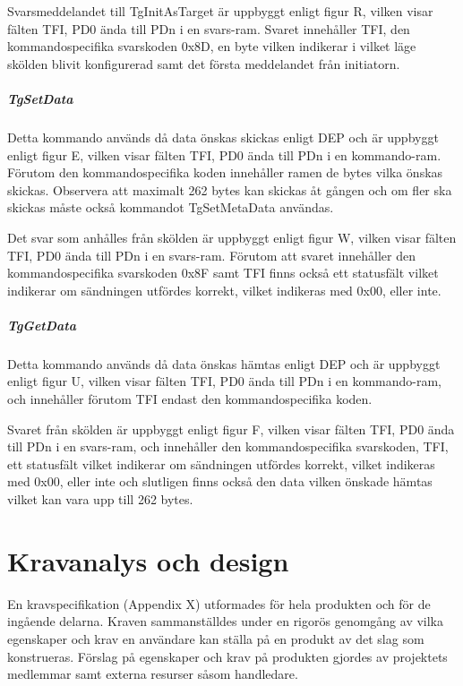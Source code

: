 \documentclass[11pt]{article}
\begin{document}
Svarsmeddelandet till TgInitAsTarget är uppbyggt enligt figur R, vilken visar fälten TFI, PD0 ända till PDn i en svars-ram. Svaret innehåller TFI, den kommandospecifika svarskoden 0x8D, en byte vilken indikerar i vilket läge skölden blivit konfigurerad samt det första meddelandet från initiatorn.


\subparagraph{TgSetData}
Detta kommando används då data önskas skickas enligt DEP och är uppbyggt enligt figur E, vilken visar fälten TFI, PD0 ända till PDn i en kommando-ram. Förutom den kommandospecifika koden innehåller ramen de bytes vilka önskas skickas. Observera att maximalt 262 bytes kan skickas åt gången och om fler ska skickas måste också kommandot TgSetMetaData användas.


Det svar som anhålles från skölden är uppbyggt enligt figur W, vilken visar fälten TFI, PD0 ända till PDn i en svars-ram. Förutom att svaret innehåller den kommandospecifika svarskoden 0x8F samt TFI finns också ett statusfält vilket indikerar om sändningen utfördes korrekt, vilket indikeras med 0x00, eller inte.


\subparagraph{TgGetData}
Detta kommando används då data önskas hämtas enligt DEP och är uppbyggt enligt figur U, vilken visar fälten TFI, PD0 ända till PDn i en kommando-ram, och innehåller förutom TFI endast den kommandospecifika koden.


Svaret från skölden är uppbyggt enligt figur F, vilken visar fälten TFI, PD0 ända till PDn i en svars-ram, och innehåller den kommandospecifika svarskoden, TFI, ett statusfält vilket indikerar om sändningen utfördes korrekt, vilket indikeras med 0x00, eller inte och slutligen finns också den data vilken önskade hämtas vilket kan vara upp till 262 bytes.


\section{Kravanalys och design}
En kravspecifikation (Appendix X) utformades för hela produkten och för de ingående delarna. Kraven sammanställdes under en rigorös genomgång av vilka egenskaper och krav en användare kan ställa på en produkt av det slag som konstrueras. Förslag på egenskaper och krav på produkten gjordes av projektets medlemmar samt externa resurser såsom handledare.
\end{document}
